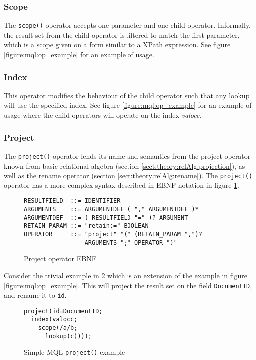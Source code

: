 \subsubsection{Scope}
\label{sect:method:marsOperators:scope}
The \texttt{scope()} operator accepts one parameter and one child operator. Informally, the
result set from the child operator is filtered to match the first parameter, which is a
scope given on a form similar to a XPath expression. See figure
\ref{figure:mql:op_example} for an example of usage.

\subsubsection{Index}
\label{sect:method:marsOperators:index}
This operator modifies the behaviour of the child operator such that any lookup
will use the specified index. See figure \ref{figure:mql:op_example} for an
example of usage where the child operators will operate on the index
\textit{valocc}.

\subsubsection{Project}
\label{sect:method:marsOperators:project}
The \texttt{project()} operator lends its name and semantics from the project operator known from basic relational
algebra (section \ref{sect:theory:relAlg:projection}), as well as the rename operator (section
\ref{sect:theory:relAlg:rename}). The \texttt{project()} operator has a more complex syntax described in EBNF
notation in figure \ref{figure:mql:ebnf:project_ebnf}.

\begin{figure}[!h]
\centering
\begin{Verbatim}
RESULTFIELD  ::= IDENTIFIER
ARGUMENTS    ::= ARGUMENTDEF ( "," ARGUMENTDEF )*
ARGUMENTDEF  ::= ( RESULTFIELD "=" )? ARGUMENT
RETAIN_PARAM ::= "retain:=" BOOLEAN
OPERATOR     ::= "project" "(" (RETAIN_PARAM ",")? 
                 ARGUMENTS ";" OPERATOR ")"
\end{Verbatim}
\caption{Project operator EBNF}
\label{figure:mql:ebnf:project_ebnf}
\end{figure}
Consider the trivial example in \ref{figure:mql:project_example} which is an
extension of the example in figure \ref{figure:mql:op_example}. This will
project the result set on the field \texttt{DocumentID}, and rename it to
\texttt{id}. 

\begin{figure}[!h]
\centering
\begin{Verbatim}
project(id=DocumentID;
  index(valocc; 
    scope(/a/b;
      lookup(c))));
\end{Verbatim}
\caption{Simple MQL \texttt{project()} example}
\label{figure:mql:project_example}
\end{figure}

